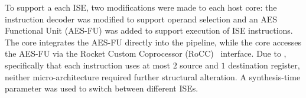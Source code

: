 \noindent
To support a each ISE, two modifications were made to each host core:
the instruction decoder was modified to support
operand selection
and
an AES Functional Unit (AES-FU) was added to support execution of
ISE instructions.
The  core integrates the AES-FU directly into the pipeline,
while
the  core accesses   the AES-FU via the
Rocket Custom Coprocessor (RoCC)~\cite[Section 4]{rocket:16}
interface.
Due to , 
specifically that each instruction uses at most $2$ source and $1$ destination register, 
neither micro-architecture required further structural alteration.
A synthesis-time parameter was used to switch between different 
ISEs.

